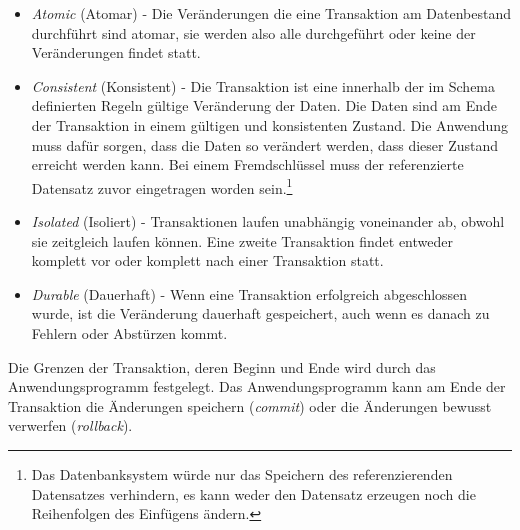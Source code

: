 \begin{itemize}
	\item \emph{Atomic} (Atomar) - Die Veränderungen die eine Transaktion am Datenbestand durchführt sind atomar, sie werden also alle durchgeführt oder keine der Veränderungen findet statt.
	\item \emph{Consistent} (Konsistent) - Die Transaktion ist eine innerhalb der im Schema definierten Regeln gültige Veränderung der Daten. Die Daten sind am Ende der Transaktion in einem gültigen und konsistenten Zustand. Die Anwendung muss dafür sorgen, dass die Daten so verändert werden, dass dieser Zustand erreicht werden kann. Bei einem Fremdschlüssel muss der referenzierte Datensatz zuvor eingetragen worden sein.\footnote{Das Datenbanksystem würde nur das Speichern des referenzierenden Datensatzes verhindern, es kann weder den Datensatz erzeugen noch die Reihenfolgen des Einfügens ändern.}
	\item \emph{Isolated} (Isoliert) - Transaktionen laufen unabhängig voneinander ab, obwohl sie zeitgleich laufen können. Eine zweite Transaktion findet entweder komplett vor oder komplett nach einer Transaktion statt.
	\item \emph{Durable} (Dauerhaft) - Wenn eine Transaktion erfolgreich abgeschlossen wurde, ist die Veränderung dauerhaft gespeichert, auch wenn es danach zu Fehlern oder Abstürzen kommt.
\end{itemize}
Die Grenzen der Transaktion, deren Beginn und Ende wird durch das Anwendungsprogramm festgelegt. Das Anwendungsprogramm kann am Ende der Transaktion die Änderungen speichern (\emph{commit}) oder die Änderungen bewusst verwerfen (\emph{rollback}).
